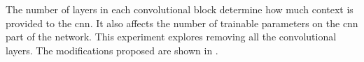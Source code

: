 
The number of layers in each convolutional block determine
how much context is provided to the \gls{cnn}. It also
affects the number of trainable parameters on the \gls{cnn}
part of the network. This experiment explores removing all
the convolutional layers. The modifications proposed are
shown in .

